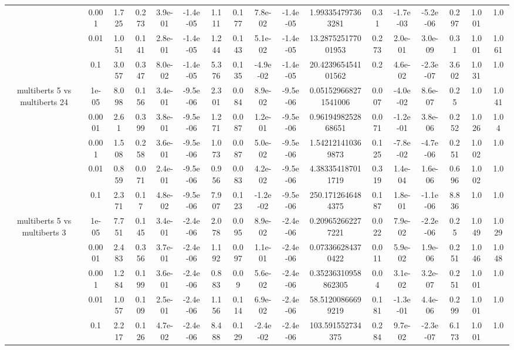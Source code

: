 \begin{tabular}{|c|c|c|c|c|c|c|c|c|c|c|c|c|c|c|c|c|}
 & 0.001 & 1.725 & 0.273 & 3.9e-01 & -1.4e-05 & 1.111 & 0.177 & 7.8e-02 & -1.4e-05 & 1.993354797363281 & 0.31 & -1.7e-03 & -5.2e-06 & 0.297 & 1.001 & 1.0 \\
 & 0.01 & 1.051 & 0.141 & 2.8e-01 & -1.4e-05 & 1.244 & 0.143 & 5.1e-02 & -1.4e-05 & 13.287525177001953 & 0.273 & 2.0e-01 & 3.0e-09 & 0.31 & 1.001 & 1.061 \\
 & 0.1 & 3.057 & 0.347 & 8.0e-02 & -1.4e-05 & 5.376 & 0.135 & -4.9e-02 & -1.4e-05 & 20.423965454101562 & 0.2 & 4.6e-02 & -2.3e-07 & 3.602 & 1.031 & 1.0 \\
\hline
\multirow{5}{*}{multiberts 5 vs multiberts 24} & 1e-05 & 8.098 & 0.156 & 3.4e-01 & -9.5e-06 & 2.301 & 0.084 & 8.9e-02 & -9.5e-06 & 0.051529668271541006 & 0.007 & -4.0e-02 & 8.6e-07 & 0.25 & 1.0 & 1.041 \\
 & 0.0001 & 2.61 & 0.399 & 3.8e-01 & -9.5e-06 & 1.271 & 0.087 & 1.2e-01 & -9.5e-06 & 0.9619498252868651 & 0.071 & -1.2e-01 & 3.8e-06 & 0.252 & 1.026 & 1.04 \\
 & 0.001 & 1.508 & 0.258 & 3.6e-01 & -9.5e-06 & 1.073 & 0.087 & 5.0e-02 & -9.5e-06 & 1.542121410369873 & 0.125 & -7.8e-02 & -4.7e-06 & 0.251 & 1.002 & 1.0 \\
 & 0.01 & 0.859 & 0.071 & 2.4e-01 & -9.5e-06 & 0.956 & 0.083 & 4.2e-02 & -9.5e-06 & 4.383354187011719 & 0.319 & 1.4e-04 & 1.6e-06 & 0.696 & 1.002 & 1.0 \\
 & 0.1 & 2.371 & 0.17 & 4.8e-02 & -9.5e-06 & 7.907 & 0.123 & -1.2e-02 & -9.5e-06 & 250.1712646484375 & 0.187 & 1.8e-01 & -1.1e-06 & 8.836 & 1.0 & 1.0 \\
\hline
\multirow{5}{*}{multiberts 5 vs multiberts 3} & 1e-05 & 7.751 & 0.145 & 3.4e-01 & -2.4e-06 & 2.078 & 0.095 & 8.9e-02 & -2.4e-06 & 0.209652662277221 & 0.022 & 7.9e-02 & -2.2e-06 & 0.25 & 1.049 & 1.029 \\
 & 0.0001 & 2.483 & 0.356 & 3.7e-01 & -2.4e-06 & 1.192 & 0.097 & 1.1e-01 & -2.4e-06 & 0.073366284370422 & 0.011 & 5.9e-02 & 1.9e-06 & 0.251 & 1.046 & 1.048 \\
 & 0.001 & 1.284 & 0.199 & 3.6e-01 & -2.4e-06 & 0.883 & 0.09 & 5.6e-02 & -2.4e-06 & 0.35236310958862305 & 0.04 & 3.1e-02 & 3.2e-07 & 0.251 & 1.001 & 1.0 \\
 & 0.01 & 1.057 & 0.109 & 2.5e-01 & -2.4e-06 & 1.156 & 0.114 & 6.9e-02 & -2.4e-06 & 58.51200866699219 & 0.181 & -1.3e-01 & 4.4e-06 & 0.299 & 1.001 & 1.0 \\
 & 0.1 & 2.217 & 0.126 & 4.7e-02 & -2.4e-06 & 8.488 & 0.129 & -2.4e-02 & -2.4e-06 & 103.591552734375 & 0.284 & 9.7e-02 & -2.3e-07 & 6.173 & 1.001 & 1.0 \\

\end{tabular}
